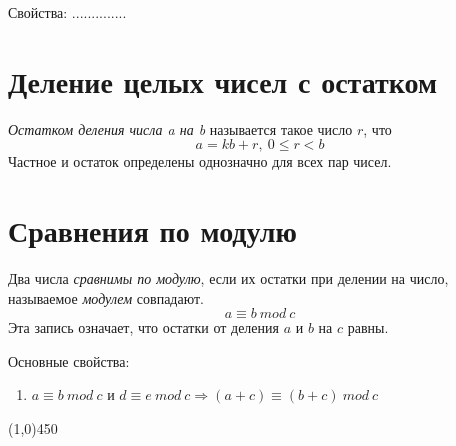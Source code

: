\documentclass[a4paper,12pt]{article}
\begin{document}
	Свойства: ..............
	
	\section*{Деление целых чисел с остатком}
	\textit{Остатком деления числа a на b} называется такое число $r$, что 
	\[
	a = kb + r, \ 0 \leq r < b
	\]
	Частное и остаток определены однозначно для всех пар чисел.
	
	\section*{Сравнения по модулю}
	Два числа \textit{сравнимы по модулю}, если их остатки при делении на число, называемое \textit{модулем} совпадают.
	\[
	a \equiv b \ mod \ c
	\]
	Эта запись означает, что остатки от деления $a$ и $b$ на $c$ равны.
	
	Основные свойства:
	\begin{enumerate}
		\item $a \equiv b \ mod \ c$ и $d \equiv e \ mod \ c \Rightarrow (a + c) \equiv (b + c) \ mod \ c$
	\end{enumerate}
	\begin{center}
		\line(1,0){450}
	\end{center}
\end{document}
